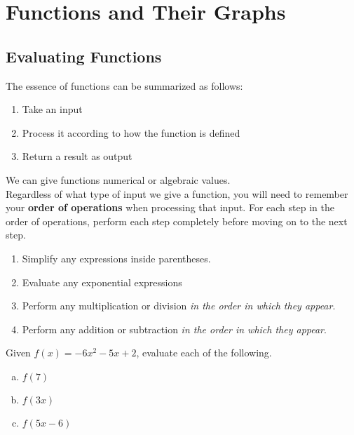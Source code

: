 \chapter{Functions and Their Graphs}

\section{Evaluating Functions}

The essence of functions can be summarized as follows:

\begin{enumerate}
    \item Take an input
    \item Process it according to how the function is defined
    \item Return a result as output
\end{enumerate}

We can give functions numerical or algebraic values. \\[18pt]

Regardless of what type of input we give a function, you will need to remember your {\color{violet}\textbf{order of operations}} when processing that input. For each step in the order of operations, perform each step completely before moving on to the next step.

\begin{enumerate}
    \item Simplify any expressions inside parentheses.
    \item Evaluate any exponential expressions
    \item Perform any multiplication or division \emph{in the order in which they appear}.
    \item Perform any addition or subtraction \emph{in the order in which they appear}.
\end{enumerate}

\vspace{18pt}

\begin{example}
Given $f(x) = -6x^2 - 5x + 2$, evaluate each of the following.
\begin{multicols}{3}
\begin{enumerate}[(a)]
    \item $f(7)$
    \item $f(3x)$
    \item $f(5x - 6)$
\end{enumerate}
\end{multicols}
\end{example}

